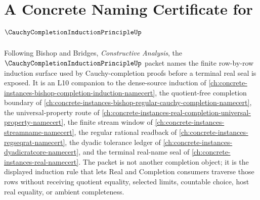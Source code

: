 \chapter{A Concrete Naming Certificate for $\CauchyCompletionInductionPrincipleUp$}
\label{ch:concrete-instances-cauchy-completion-induction-principle-namecert}

Following Bishop and Bridges, \emph{Constructive Analysis}, the $\CauchyCompletionInductionPrincipleUp$ packet names the finite row-by-row induction surface used by Cauchy-completion proofs before a terminal real seal is exposed. It is an L10 companion to the dense-source induction of \autoref{ch:concrete-instances-bishop-completion-induction-namecert}, the quotient-free completion boundary of \autoref{ch:concrete-instances-bishop-regular-cauchy-completion-namecert}, the universal-property route of \autoref{ch:concrete-instances-real-completion-universal-property-namecert}, the finite stream window of \autoref{ch:concrete-instances-streamname-namecert}, the regular rational readback of \autoref{ch:concrete-instances-regseqrat-namecert}, the dyadic tolerance ledger of \autoref{ch:concrete-instances-dyadicratcore-namecert}, and the terminal real-name seal of \autoref{ch:concrete-instances-real-namecert}. The packet is not another completion object; it is the displayed induction rule that lets Real and Completion consumers traverse those rows without receiving quotient equality, selected limits, countable choice, host real equality, or ambient completeness.

